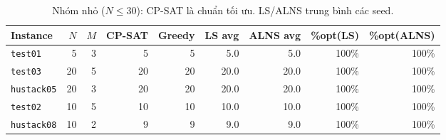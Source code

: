 \begin{table}[H]
\centering\small
\caption{Nhóm nhỏ ($N\le 30$): CP-SAT là chuẩn tối ưu. LS/ALNS trung bình các seed.}
\label{tab:bench-small}
\begin{tabular}{lrr rr rr rr}
\toprule
Instance & $N$ & $M$ & CP-SAT & Greedy & LS avg & ALNS avg & \%opt(LS) & \%opt(ALNS) \\
\midrule
\texttt{test01} & 5 & 3 & 5 & 5 & 5.0 & 5.0 & 100\% & 100\% \\
\texttt{test03} & 20 & 5 & 20 & 20 & 20.0 & 20.0 & 100\% & 100\% \\
\texttt{hustack05} & 20 & 3 & 20 & 20 & 20.0 & 20.0 & 100\% & 100\% \\
\texttt{test02} & 10 & 5 & 10 & 10 & 10.0 & 10.0 & 100\% & 100\% \\
\texttt{hustack08} & 10 & 2 & 9 & 9 & 9.0 & 9.0 & 100\% & 100\% \\
\bottomrule
\end{tabular}
\end{table}
